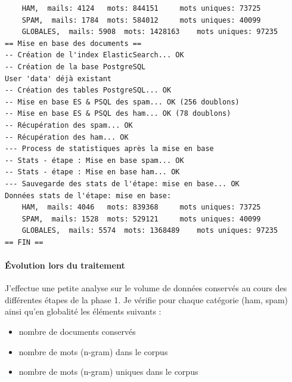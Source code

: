 \documentclass[a4paper,12pt]{article}
\begin{document}
\begin{verbatim}
	HAM,  mails: 4124 	mots: 844151	 mots uniques: 73725
	SPAM,  mails: 1784 	mots: 584012	 mots uniques: 40099
	GLOBALES,  mails: 5908 	mots: 1428163	 mots uniques: 97235
== Mise en base des documents ==
-- Création de l'index ElasticSearch... OK
-- Création de la base PostgreSQL
User 'data' déjà existant
-- Création des tables PostgreSQL... OK
-- Mise en base ES & PSQL des spam... OK (256 doublons)                                                                                                                                                                                       
-- Mise en base ES & PSQL des ham... OK (78 doublons)                                                                                                                                                                                         
-- Récupération des spam... OK
-- Récupération des ham... OK
--- Process de statistiques après la mise en base
-- Stats - étape : Mise en base spam... OK                                                                                                                                                                                                    
-- Stats - étape : Mise en base ham... OK                                                                                                                                                                                                     
--- Sauvegarde des stats de l'étape: mise en base... OK
Données stats de l'étape: mise en base:
	HAM,  mails: 4046 	mots: 839368	 mots uniques: 73725
	SPAM,  mails: 1528 	mots: 529121	 mots uniques: 40099
	GLOBALES,  mails: 5574 	mots: 1368489	 mots uniques: 97235
== FIN ==

		\end{verbatim}
		
		\paragraph{Évolution lors du traitement}
			J'effectue une petite analyse sur le volume de données conservés au cours des différentes étapes de la phase 1. Je vérifie pour chaque catégorie (ham, spam) ainsi qu'en globalité les éléments suivants : 
			\begin{itemize}
				\item nombre de documents conservés
				\item nombre de mots (n-gram) dans le corpus
				\item nombre de mots (n-gram) uniques dans le corpus
			\end{itemize}
			
\end{document}
